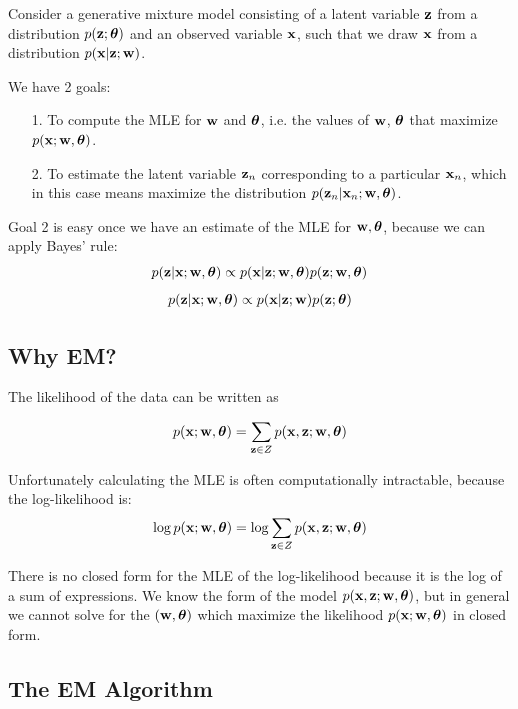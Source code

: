 \documentclass[12pt,letterpaper]{article}
\begin{document}
\smallskip 

Consider a generative mixture model consisting of a latent variable $\mathbf{z}$ from a distribution $p(\mathbf{z}; \boldsymbol{\theta})$ and an observed variable $\mathbf{x}$, such that we draw $\mathbf{x}$ from a distribution $p(\mathbf{x} | \mathbf{z}; \mathbf{w})$.

\smallskip

We have 2 goals: 

\begin{itemize}
    \item[1.] To compute the MLE for $\mathbf{w}$ and $\boldsymbol{\theta}$, i.e. the values of $\mathbf{w}$, $\boldsymbol{\theta}$ that maximize $p(\mathbf{x}; \mathbf{w}, \boldsymbol{\theta})$.
    \item[2.] To estimate the latent variable $\mathbf{z}_n$ corresponding to a particular $\mathbf{x}_n$, which in this case means maximize the distribution $p(\mathbf{z}_n | \mathbf{x}_n; \mathbf{w}, \boldsymbol{\theta})$.
\end{itemize}

Goal 2 is easy once we have an estimate of the MLE for $\mathbf{w}, \boldsymbol{\theta}$, because we can apply Bayes' rule:
$$p(\mathbf{z} | \mathbf{x}; \mathbf{w}, \boldsymbol{\theta}) \propto p(\mathbf{x} | \mathbf{z}; \mathbf{w}, \boldsymbol{\theta} )p(\mathbf{z}; \mathbf{w}, \boldsymbol{\theta})$$
\begin{align}p(\mathbf{z} | \mathbf{x}; \mathbf{w}, \boldsymbol{\theta}) \propto p(\mathbf{x} | \mathbf{z}; \mathbf{w})p(\mathbf{z}; \boldsymbol{\theta})\end{align}

\subsection{Why EM?}
The likelihood of the data can be written as 

$$p(\mathbf{x}; \mathbf{w}, \boldsymbol{\theta}) = \sum_{\mathbf{z} \in Z} p(\mathbf{x}, \mathbf{z}; \mathbf{w}, \boldsymbol{\theta})$$

Unfortunately calculating the MLE is often computationally intractable, because the log-likelihood is:
\begin{align}
    \log p(\mathbf{x}; \mathbf{w}, \boldsymbol{\theta}) = \log \sum_{\mathbf{z} \in Z} p(\mathbf{x}, \mathbf{z}; \mathbf{w}, \boldsymbol{\theta})
\end{align}

There is no closed form for the MLE of the log-likelihood because it is the log of a sum of expressions.  We know the form of the model $p(\mathbf{x}, \mathbf{z}; \mathbf{w}, \boldsymbol{\theta})$, but in general we cannot solve for the $(\mathbf{w}, \boldsymbol{\theta})$ which maximize the likelihood $p(\mathbf{x}; \mathbf{w}, \boldsymbol{\theta})$ in closed form. 

\newpage
\subsection{The EM Algorithm}
\end{document}
